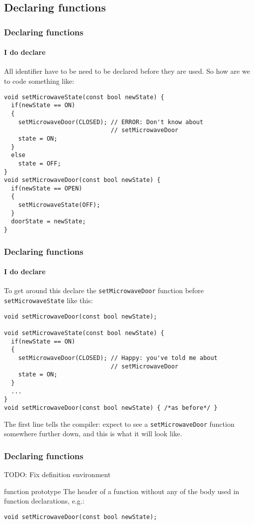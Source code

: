 \documentclass{beamer}
\begin{document}
\subsection{Declaring functions}

\begin{frame}[fragile]
  \frametitle{Declaring functions}
  \framesubtitle{I do declare}
  
  All identifier have to be need to be declared before they are used.  So how are we to code something like:
  \begin{lstlisting}
void setMicrowaveState(const bool newState) {
  if(newState == ON)
  {
    setMicrowaveDoor(CLOSED); // ERROR: Don't know about 
                              // setMicrowaveDoor
    state = ON;
  }
  else
  	state = OFF;
}
void setMicrowaveDoor(const bool newState) {
  if(newState == OPEN)
  {
    setMicrowaveState(OFF);
  }
  doorState = newState;
}
  \end{lstlisting}
\end{frame}


\begin{frame}[fragile]
  \frametitle{Declaring functions}
  \framesubtitle{I do declare}
  
  To get around this declare the \texttt{setMicrowaveDoor} function before \texttt{setMicrowaveState} like this:
  \begin{lstlisting}
void setMicrowaveDoor(const bool newState);

void setMicrowaveState(const bool newState) {
  if(newState == ON)
  {
    setMicrowaveDoor(CLOSED); // Happy: you've told me about
                              // setMicrowaveDoor
    state = ON;
  }
  ...
}
void setMicrowaveDoor(const bool newState) { /*as before*/ }
  \end{lstlisting}
  The first line tells the compiler: expect to see a \texttt{setMicrowaveDoor} function somewhere further down, and this is what it will look like.
\end{frame}

\begin{frame}[fragile]
  \frametitle{Declaring functions}
  TODO: Fix definition environment
  \begin{defiblocke}{function prototype}%
The header of a function without any of the body used in function declarations, e.g.:
    \begin{lstlisting}
void setMicrowaveDoor(const bool newState);
    \end{lstlisting}
  \end{defiblocke}
\end{frame}
\end{document}
